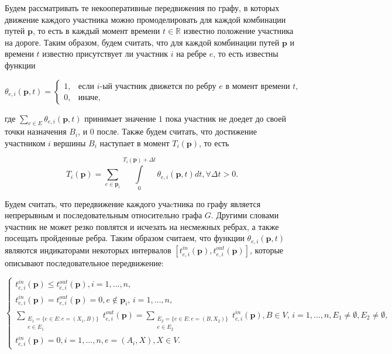 \documentclass[12pt, a4paper]{article}
\begin{document}
Будем рассматривать те некооперативные передвижения по графу, в которых движение каждого участника можно промоделировать для каждой комбинации путей $\textbf{p}$, то есть в каждый момент времени $t \in \mathbb{R}$ известно положение участника на дороге. Таким образом, будем считать, что для каждой комбинации путей $\textbf{p}$ и времени $t$ известно присутствует ли участник $i$ на ребре $e$, то есть известны функции

$$
\theta_{e, i} (\textbf{p}, t) =
\begin{cases}
	1, & \text{если }  i\text{-ый участник движется по ребру $e$ в момент времени $t$,}  \\
	0, & \text{иначе},
\end{cases}
$$

где $\sum\limits_{e \in E} \theta_{e, i} (\textbf{p}, t)$ принимает значение $1$ пока участник не доедет до своей точки назначения $B_i$, и $0$ после. Также будем считать, что достижение  участником $i$ вершины $B_i$ наступает в момент $T_i(\textbf{p})$, то есть 
	
\begin{equation}
	\label{eq:T_i_by_theta}
	T_i(\textbf{p}) = \sum \limits_{e \in \textbf{p}_i} \int\limits_{0}^{T_i(\textbf{p}) + \Delta t} \theta_{e, i} (\textbf{p}, t) dt, \forall \Delta t > 0.
\end{equation}

Будем считать, что передвижение каждого учаcтника по графу является непрерывным и последовательным относительно графа $G$. Другими словами участник не может резко повлятся и исчезать на несмежных ребрах, а также посещать пройденные ребра. Таким образом считаем, что функции $\theta_{e, i} (\textbf{p}, t)$ являются индикаторами некоторых интервалов $[t_{e, i}^{in} (\textbf{p}), t_{e, i}^{out} (\textbf{p})]$, которые описывают последовательное передвижение:

\begin{equation}
	\label{eq:restr_t}
	\begin{cases}
		t_{e, i}^{in}(\textbf{p}) \le t_{e, i}^{out}(\textbf{p}), i = 1, \dots, n,
		\\
		t_{e, i}^{in}(\textbf{p}) = t_{e, i}^{out}(\textbf{p}) = 0, e \notin \textbf{p}_i,\, i = 1, \dots, n,
		\\
		\sum \limits_{ \substack{E_1 = \{ e \in E: e = (X_1, B) \} \\ e \in E_1}} t_{e, i}^{out} (\textbf{p}) = \sum \limits_{ \substack{E_2 = \{ e \in E: e = (B, X_2) \} \\ e \in E_2}} t_{e, i}^{in} (\textbf{p}), B \in V,\, i = 1, \dots, n, E_1 \ne \emptyset, E_2 \ne \emptyset,
		\\
		t_{e, i}^{in} (\textbf{p}) = 0, i = 1, \dots, n,  e = (A_i, X), X \in V.
	\end{cases}
\end{equation}
\end{document}
